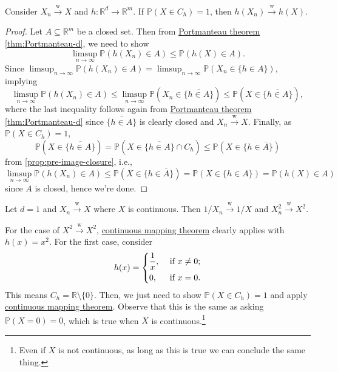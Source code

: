 \begin{theorem}\label{thm:continuous-mapping}
	Consider \(X_n \overset{\text{w} }{\to } X\) and \(h \colon \mathbb{R} ^d \to \mathbb{R} ^m\). If \(\mathbb{P} (X \in C_h) = 1\), then \(h(X_n) \overset{\text{w} }{\to } h(X)\).
\end{theorem}
\begin{proof}
	Let \(A \subseteq \mathbb{R} ^m\) be a closed set. Then from \hyperref[thm:Portmanteau]{Portmanteau theorem} \autoref{thm:Portmanteau-d}, we need to show
	\[
		\limsup_{n \to \infty} \mathbb{P} (h(X_n) \in A)
		\leq \mathbb{P} (h(X) \in A).
	\]
	Since \(\limsup_{n \to \infty} \mathbb{P} (h(X_n) \in A) = \limsup_{n \to \infty} \mathbb{P} (X_n \in \{ h \in A \} )\), implying
	\[
		\limsup_{n \to \infty} \mathbb{P} (h(X_n) \in A)
		\leq \limsup_{n \to \infty} \mathbb{P} (X_n \in \overline{\{ h \in A \}} )
		\leq \mathbb{P} (X \in \overline{\{ h \in A \} }),
	\]
	where the last inequality follows again from \hyperref[thm:Portmanteau]{Portmanteau theorem} \autoref{thm:Portmanteau-d} since \(\overline{\{ h \in A \} }\) is clearly closed and \(X_n \overset{\text{w} }{\to } X\). Finally, as \(\mathbb{P} (X \in C_h) = 1\),
	\[
		\mathbb{P} (X \in \overline{\{ h \in A \} })
		= \mathbb{P} (X \in \overline{\{ h \in A \} } \cap C_h)
		\leq \mathbb{P} (X \in \{ h \in \overline{A} \} )
	\]
	from \autoref{prop:pre-image-closure}, i.e.,
	\[
		\limsup_{n \to \infty} \mathbb{P} (h(X_n) \in A)
		\leq \mathbb{P} (X \in \{ h \in \overline{A} \} )
		= \mathbb{P} (X \in \{ h \in A \} )
		= \mathbb{P} (h(X) \in A)
	\]
	since \(A\) is closed, hence we're done.
\end{proof}

\begin{eg}
	Let \(d = 1\) and \(X_n \overset{\text{w} }{\to } X\) where \(X\) is continuous. Then \(1 / X_n \overset{\text{w} }{\to } 1 / X\) and \(X_n^2 \overset{\text{w} }{\to } X^2\).
\end{eg}
\begin{explanation}
	For the case of \(X^2 \overset{\text{w} }{\to } X^2\), \hyperref[thm:continuous-mapping]{continuous mapping theorem} clearly applies with \(h(x) = x^2\). For the first case, consider
	\[
		h(x) = \begin{dcases}
			\frac{1}{x}, & \text{ if } x \neq 0 ; \\
			0,           & \text{ if } x = 0 .
		\end{dcases}
	\]
	This means \(C_h = \mathbb{R} \setminus \{ 0 \} \). Then, we just need to show \(\mathbb{P} (X \in C_h) = 1 \) and apply \hyperref[thm:continuous-mapping]{continuous mapping theorem}. Observe that this is the same as asking \(\mathbb{P} (X = 0) = 0\), which is true when \(X\) is continuous.\footnote{Even if \(X\) is not continuous, as long as this is true we can conclude the same thing.}
\end{explanation}

